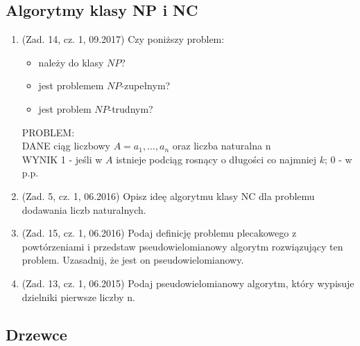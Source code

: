 \documentclass[10pt]{article}%
\begin{document}
\subsection{Algorytmy klasy NP i NC}

\begin{enumerate}

\item (Zad. 14, cz. 1, 09.2017) Czy poniższy problem:
\begin{itemize}
\item należy do klasy $NP$?
\item jest problemem $NP$-zupełnym?
\item jest problem $NP$-trudnym?
\end{itemize}
PROBLEM: \\
\indent DANE ciąg liczbowy $A = a_1,\ldots,a_n$ oraz liczba naturalna n \\
\indent WYNIK 1 - jeśli w $A$ istnieje podciąg rosnący o długości co najmniej $k$; 0 - w p.p.

\item (Zad. 5, cz. 1, 06.2016) Opisz ideę algorytmu klasy NC dla problemu dodawania liczb naturalnych.

\item (Zad. 15, cz. 1, 06.2016) Podaj definicję problemu plecakowego z powtórzeniami i przedstaw pseudowielomianowy algorytm rozwiązujący ten problem. Uzasadnij, że jest on pseudowielomianowy.

\item (Zad. 13, cz. 1, 06.2015) Podaj pseudowielomianowy algorytm, który wypisuje dzielniki pierwsze liczby n.

\end{enumerate}


\subsection{Drzewce}
\end{document}
